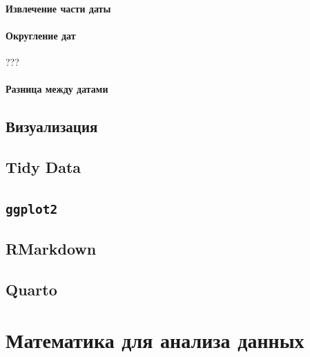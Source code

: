 \documentclass[
  letterpaper,
]{scrbook}
\theoremstyle{definition}
\theoremstyle{remark}
\begin{document}
\subsection{Извлечение части даты}\label{rdates-manipulations-extract}

\subsection{Округление дат}\label{rdates-manipulations-round}

???

\subsection{Разница между датами}\label{rdates-manipulations-diff}


\chapter{Визуализация}\label{rvis}


\chapter{Tidy Data}\label{rtidy}


\chapter{\texorpdfstring{\texttt{ggplot2}}{ggplot2}}\label{rggplot2}


\chapter{RMarkdown}\label{rmarkdown}


\chapter{Quarto}\label{quarto}

\part{Математика для анализа данных}
\end{document}
